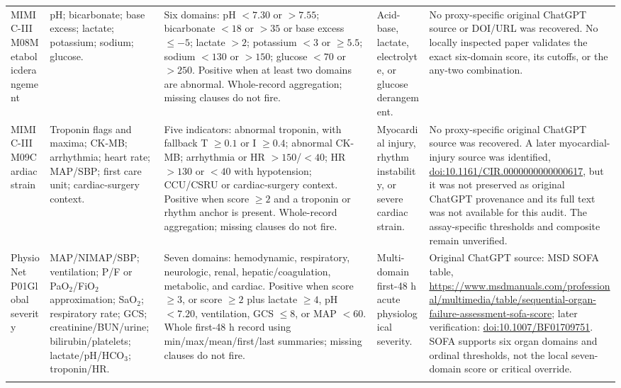 \documentclass[letterpaper,10pt]{article}
\begin{document}
\begin{landscape}
\begin{longtable}{@{}L{0.88in}L{1.72in}L{2.32in}L{1.05in}L{2.82in}@{}}
MIMIC-III M08\newline Metabolic\newline derangement &
pH; bicarbonate; base excess; lactate; potassium; sodium; glucose. &
Six domains: pH $<7.30$ or $>7.55$; bicarbonate $<18$ or $>35$ or
base excess $\leq-5$; lactate $>2$; potassium $<3$ or $\geq5.5$;
sodium $<130$ or $>150$; glucose $<70$ or $>250$. Positive when at
least two domains are abnormal. Whole-record aggregation; missing clauses do
not fire. &
Acid-base, lactate, electrolyte, or glucose derangement. &
No proxy-specific original ChatGPT source or DOI/URL was recovered. No locally
inspected paper validates the exact six-domain score, its cutoffs, or the
any-two combination. \\
\addlinespace

MIMIC-III M09\newline Cardiac strain &
Troponin flags and maxima; CK-MB; arrhythmia; heart rate; MAP/SBP; first care
unit; cardiac-surgery context. &
Five indicators: abnormal troponin, with fallback T $\geq0.1$ or
I $\geq0.4$; abnormal CK-MB; arrhythmia or HR $>150$/$<40$;
HR $>130$ or $<40$ with hypotension; CCU/CSRU or cardiac-surgery context.
Positive when score $\geq2$ and a troponin or rhythm anchor is present.
Whole-record aggregation; missing clauses do not fire. &
Myocardial injury, rhythm instability, or severe cardiac strain. &
No proxy-specific original ChatGPT source was recovered. A later
myocardial-injury source was identified,
\href{https://doi.org/10.1161/CIR.0000000000000617}
{doi:10.1161/CIR.0000000000000617}, but it was not preserved as original
ChatGPT provenance and its full text was not available for this audit.
The assay-specific thresholds and composite remain unverified. \\

\midrule

PhysioNet P01\newline Global severity &
MAP/NIMAP/SBP; ventilation; P/F or PaO$_2$/FiO$_2$ approximation;
SaO$_2$; respiratory rate; GCS; creatinine/BUN/urine;
bilirubin/platelets; lactate/pH/HCO$_3$; troponin/HR. &
Seven domains: hemodynamic, respiratory, neurologic, renal,
hepatic/coagulation, metabolic, and cardiac. Positive when score $\geq3$, or
score $\geq2$ plus lactate $\geq4$, pH $<7.20$, ventilation,
GCS $\leq8$, or MAP $<60$. Whole first-48 h record using
min/max/mean/first/last summaries; missing clauses do not fire. &
Multi-domain first-48 h acute physiological severity. &
Original ChatGPT source: MSD SOFA table,
\url{https://www.msdmanuals.com/professional/multimedia/table/sequential-organ-failure-assessment-sofa-score};
later verification:
\href{https://doi.org/10.1007/BF01709751}{doi:10.1007/BF01709751}.
SOFA supports six organ domains and ordinal thresholds, not the local
seven-domain score or critical override. \\
\addlinespace


\end{longtable}
\end{landscape}
\end{document}
